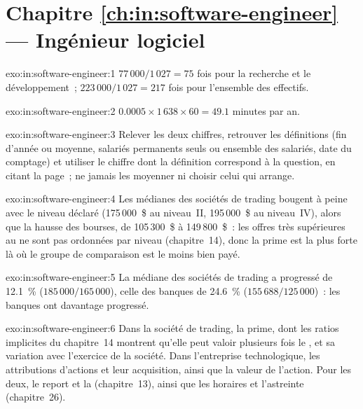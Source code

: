 \section*{Chapitre \ref{ch:in:software-engineer} --- Ingénieur logiciel}

\begin{solution}{exo:in:software-engineer:1}
$77\,000/1\,027=75$ fois pour la recherche et le développement~; $223\,000/1\,027=217$ fois pour l'ensemble des effectifs.
\end{solution}

\begin{solution}{exo:in:software-engineer:2}
$0.0005\times1\,638\times60=49.1$ minutes par an.
\end{solution}

\begin{solution}{exo:in:software-engineer:3}
Relever les deux chiffres, retrouver les définitions (fin d'année ou moyenne, salariés permanents seuls ou ensemble des salariés, date du comptage) et utiliser le
chiffre dont la définition correspond à la question, en citant la page~; ne jamais les moyenner ni choisir celui qui arrange.
\end{solution}

\begin{solution}{exo:in:software-engineer:4}
Les médianes des sociétés de trading bougent à peine avec le niveau déclaré (175\,000~\$ au niveau~II, 195\,000~\$ au niveau~IV), alors que la
hausse des bourses, de 105\,300~\$ à 149\,800~\$~: les offres très supérieures au  ne sont pas ordonnées par niveau
(chapitre~14), donc la prime est la plus forte là où le groupe de comparaison est le moins bien payé.
\end{solution}

\begin{solution}{exo:in:software-engineer:5}
La médiane des sociétés de trading a progressé de 12.1~\% ($185\,000/165\,000$), celle des banques de 24.6~\% ($155\,688/125\,000$)~: les banques ont
davantage progressé.
\end{solution}

\begin{solution}{exo:in:software-engineer:6}
Dans la société de trading, la prime, dont les ratios implicites du chapitre~14 montrent qu'elle peut valoir plusieurs fois le , et sa variation avec
l'exercice de la société. Dans l'entreprise technologique, les attributions d'actions et leur acquisition, ainsi que la valeur de l'action. Pour les deux,
le report et la  (chapitre~13), ainsi que les horaires et l'astreinte (chapitre~26).
\end{solution}

